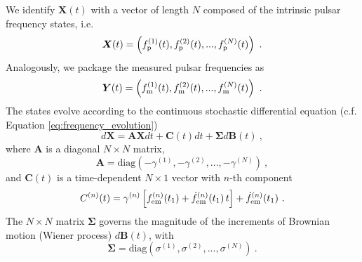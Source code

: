 \documentclass[fleqn,usenatbib,useAMS]{mnras}
\begin{document}
We identify $\boldsymbol{X}(t)$ with a vector of length $N$ composed of the intrinsic pulsar frequency states, i.e. 
\begin{equation}
	\boldsymbol{X}(t) = \left(f_{\rm p}^{(1)}(t), f_{\rm p}^{(2)}(t), ..., f_{\rm p}^{(N)}(t)\right) \ .
\end{equation}
Analogously,  we package the measured pulsar frequencies as
\begin{equation}
	\boldsymbol{Y}(t) = \left(f_{\rm m}^{(1)}(t), f_{\rm m}^{(2)}(t), ..., f_{\rm m}^{(N)}(t) \right) \ .
\end{equation}
The states evolve according to the continuous stochastic differential equation (c.f. Equation \eqref{eq:frequency_evolution})
\begin{equation}
	d \boldsymbol{X} = \boldsymbol{A} \boldsymbol{X} dt + \boldsymbol{C}(t) dt + \boldsymbol{\Sigma} d \boldsymbol{B}(t) \ , \label{eq:kalmn2}
\end{equation}
where $\boldsymbol{A}$ is a diagonal $N \times N$ matrix,
\begin{equation}
	\boldsymbol{A} = \text{diag} \left(-\gamma^{(1)}, -\gamma^{(2)}, ..., -\gamma^{(N)}\right) \ ,
\end{equation}
and $\boldsymbol{C}(t)$ is a time-dependent $N \times 1$ vector with $n$-th component
\begin{equation}
	C^{(n)}(t) =\gamma^{(n)} \left[ f^{(n)} _{\rm em} (t_1) + \dot{f}^{(n)} _{\rm em}(t_1) \, t \right] +  \dot{f}^{(n)} _{\rm em}(t_1)\ .
\end{equation}
The $N \times N$ matrix $\boldsymbol{\Sigma}$  governs the magnitude of the increments of Brownian motion (Wiener process) $d\boldsymbol{B}(t)$, with
\begin{equation}
	\boldsymbol{\Sigma} = \text{diag} \left(\sigma^{(1)}, \sigma^{(2)}, ..., \sigma^{(N)}\right) \ .
\end{equation}
\end{document}
